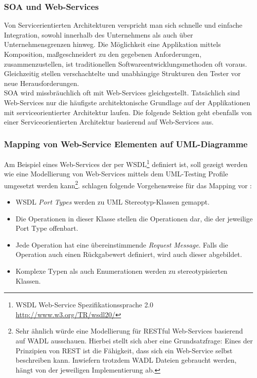\subsubsection{SOA und Web-Services}
Von Servicerientierten Architekturen verspricht man sich schnelle und einfache Integration, sowohl innerhalb des Unternehmens als auch über Unternehmensgrenzen hinweg. Die Möglichkeit eine Applikation mittels Komposition, maßgeschneidert zu den gegebenen Anforderungen, zusammenzustellen, ist traditionellen Softwareentwicklungsmethoden oft voraus. Gleichzeitig stellen verschachtelte und unabhängige Strukturen den Tester vor neue Herausforderungen. \\
SOA wird missbräuchlich oft mit Web-Services gleichgestellt. Tatsächlich sind Web-Services nur die häufigste architektonische Grundlage auf der Applikationen mit  serviceorientierter Architektur laufen. Die folgende Sektion geht ebenfalls von einer Serviceorientierten Architektur basierend auf Web-Services aus.

\subsubsection{Mapping von Web-Service Elementen auf UML-Diagramme}
Am Beispiel eines Web-Services der per WSDL\footnote{WSDL Web-Service Spezifikationssprache 2.0 \url{http://www.w3.org/TR/wsdl20/}} definiert ist, soll gezeigt werden wie eine Modellierung von Web-Services mittels dem UML-Testing Profile umgesetzt werden kann\footnote{Sehr ähnlich würde eine Modellierung für RESTful Web-Services basierend auf WADL ausschauen. Hierbei stellt sich aber eine Grundsatzfrage: Eines der Prinzipien von REST ist die Fähigkeit, dass sich ein Web-Service selbst beschreiben kann. Inwiefern trotzdem WADL Dateien gebraucht werden, hängt von der jeweiligen Implementierung ab.}. \citeauthor{_model-driven_2007} schlagen folgende Vorgehensweise für das Mapping vor \cite{_model-driven_2007}:

\begin{itemize}
\item WSDL \textit{Port Types} werden zu \Gls{UML} Stereotyp-Klassen gemappt.
\item Die Operationen in dieser Klasse stellen die Operationen dar, die der jeweilige Port Type offenbart.
\item Jede Operation hat eine übereinstimmende \textit{Request Message}. Falls die Operation auch einen Rückgabewert definiert, wird auch dieser abgebildet.
\item Komplexe Typen als auch Enumerationen werden zu stereotypisierten Klassen.
\end{itemize}

